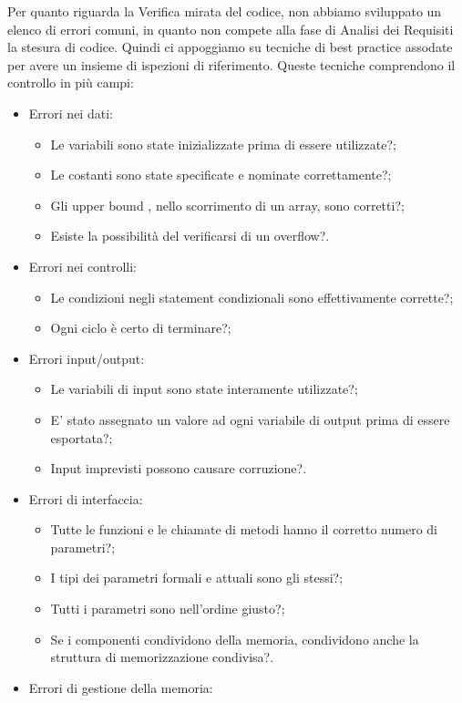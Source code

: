 Per quanto riguarda la Verifica mirata del codice, non abbiamo sviluppato un elenco di errori comuni, in quanto non compete alla fase di Analisi dei Requisiti la stesura di codice.
Quindi ci appoggiamo su tecniche di best practice assodate per avere un insieme di ispezioni di riferimento. Queste tecniche comprendono il controllo in più campi:
\begin{itemize}
\item Errori nei dati:
	\begin{itemize}
	\item Le variabili sono state inizializzate prima di essere utilizzate?;
	\item Le costanti sono state specificate e nominate correttamente?;
	\item Gli upper bound , nello scorrimento di un array, sono corretti?;
	\item Esiste la possibilità del verificarsi di un overflow?.
	\end{itemize}
\item Errori nei controlli:
	\begin{itemize}
	\item Le condizioni negli statement condizionali sono effettivamente corrette?;
	\item Ogni ciclo è certo di terminare?;
	\end{itemize}
\item Errori input/output:
	\begin{itemize}
	\item Le variabili di input sono state interamente utilizzate?;
	\item E' stato assegnato un valore ad ogni variabile di output prima di essere esportata?;
	\item Input imprevisti possono causare corruzione?.
	\end{itemize}
\item Errori di interfaccia:
	\begin{itemize}
	\item Tutte le funzioni e le chiamate di metodi hanno il corretto numero di parametri?;
	\item I tipi dei parametri formali e attuali sono gli stessi?;
	\item Tutti i parametri sono nell'ordine giusto?;
	\item Se i componenti condividono della memoria, condividono anche la struttura di memorizzazione condivisa?.
	\end{itemize}		
\item Errori di gestione della memoria:	

\end{itemize}
